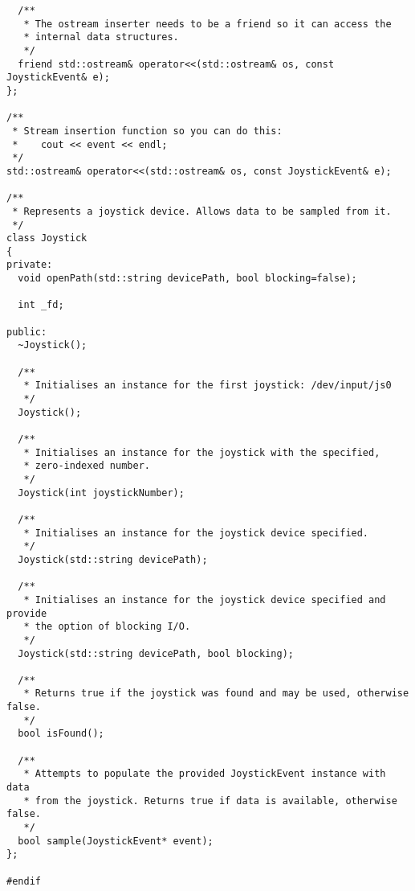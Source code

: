 \documentclass[a4paper,11pt]{article}
\begin{document}
\begin{lstlisting}
  /**
   * The ostream inserter needs to be a friend so it can access the
   * internal data structures.
   */
  friend std::ostream& operator<<(std::ostream& os, const JoystickEvent& e);
};

/**
 * Stream insertion function so you can do this:
 *    cout << event << endl;
 */
std::ostream& operator<<(std::ostream& os, const JoystickEvent& e);

/**
 * Represents a joystick device. Allows data to be sampled from it.
 */
class Joystick
{
private:
  void openPath(std::string devicePath, bool blocking=false);
  
  int _fd;
  
public:
  ~Joystick();

  /**
   * Initialises an instance for the first joystick: /dev/input/js0
   */
  Joystick();

  /**
   * Initialises an instance for the joystick with the specified,
   * zero-indexed number.
   */
  Joystick(int joystickNumber);

  /**
   * Initialises an instance for the joystick device specified.
   */
  Joystick(std::string devicePath);

  /**
   * Initialises an instance for the joystick device specified and provide
   * the option of blocking I/O.
   */
  Joystick(std::string devicePath, bool blocking);
 
  /**
   * Returns true if the joystick was found and may be used, otherwise false.
   */
  bool isFound();
  
  /**
   * Attempts to populate the provided JoystickEvent instance with data
   * from the joystick. Returns true if data is available, otherwise false.
   */
  bool sample(JoystickEvent* event);
};

#endif
\end{lstlisting}
\end{document}
